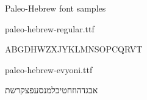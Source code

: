 \documentclass[11pt]{book}
\begin{document}
\begin{center}
  {\Large Paleo-Hebrew font samples}

  \vspace{2em}
  {\large paleo-hebrew-regular.ttf}\par
  \vspace{0.6em}
  {\RegularPaleo\fontsize{28}{38}\selectfont ABGDHWZXJYKLMNSOPCQRVT\par}

  \vspace{3em}
  {\large paleo-hebrew-evyoni.ttf}\par
  \vspace{0.6em}
  {\EvyoniPaleo\fontsize{24}{34}\selectfont אבגדהוזחטיכלמנסעפצקרשת\par}
\end{center}
\end{document}

